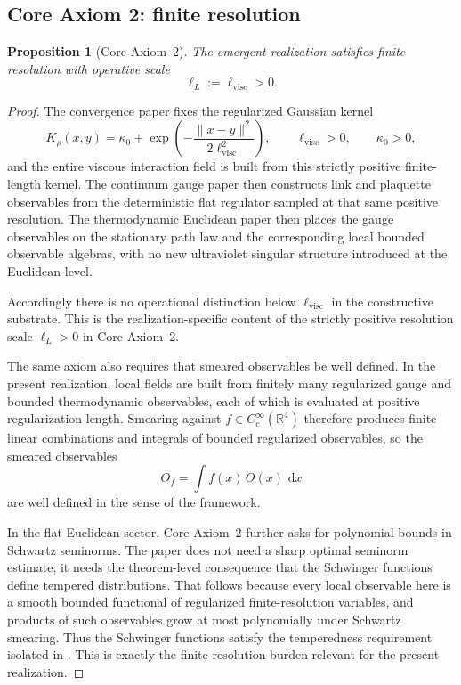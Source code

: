\documentclass[11pt]{article}
\newtheorem{proposition}[theorem]{Proposition}
\theoremstyle{definition}
\theoremstyle{remark}
\newcommand{\R}{\mathbb R}
\newcommand{\dd}{\,\mathrm d}
\begin{document}
\subsection{Core Axiom 2: finite resolution}

\begin{proposition}[Core Axiom~2]
\label{prop:ca2}
The emergent realization satisfies finite resolution with operative scale
\[
\ell_L:=\ell_{\mathrm{visc}}>0.
\]
\end{proposition}

\begin{proof}
The convergence paper fixes the regularized Gaussian kernel
\[
K_\rho(x,y)=\kappa_0+\exp\!\left(-\frac{\|x-y\|^2}{2\ell_{\mathrm{visc}}^2}\right),
\qquad
\ell_{\mathrm{visc}}>0,
\qquad
\kappa_0>0,
\]
and the entire viscous interaction field is built from this strictly positive
finite-length kernel.
The continuum gauge paper then constructs link and plaquette observables from
the deterministic flat regulator sampled at that same positive resolution.
The thermodynamic Euclidean paper then places the gauge observables on the
stationary path law and the corresponding local bounded observable algebras,
with no new ultraviolet singular structure introduced at the Euclidean level.

Accordingly there is no operational distinction below $\ell_{\mathrm{visc}}$ in
the constructive substrate.  This is the realization-specific content of the
strictly positive resolution scale $\ell_L>0$ in Core Axiom~2.

The same axiom also requires that smeared observables be well defined.  In the
present realization, local fields are built from finitely many regularized
gauge and bounded thermodynamic observables, each of which is evaluated at
positive regularization length.  Smearing against
$f\in C_c^\infty(\R^4)$ therefore produces finite linear combinations and
integrals of bounded regularized observables, so the smeared observables
\[
O_f=\int f(x)\,O(x)\,\dd x
\]
are well defined in the sense of the framework.

In the flat Euclidean sector, Core Axiom~2 further asks for polynomial bounds
in Schwartz seminorms.  The paper does not need a sharp optimal
seminorm estimate; it needs the theorem-level consequence that the Schwinger
functions define tempered distributions.  That follows because every local
observable here is a smooth bounded functional of regularized finite-resolution
variables, and products of such observables grow at most polynomially under
Schwartz smearing.  Thus the Schwinger functions satisfy the temperedness
requirement isolated in \cite[OS0 discussion]{axioms}.  This is exactly the
finite-resolution burden relevant for the present realization.
\end{proof}
\end{document}
